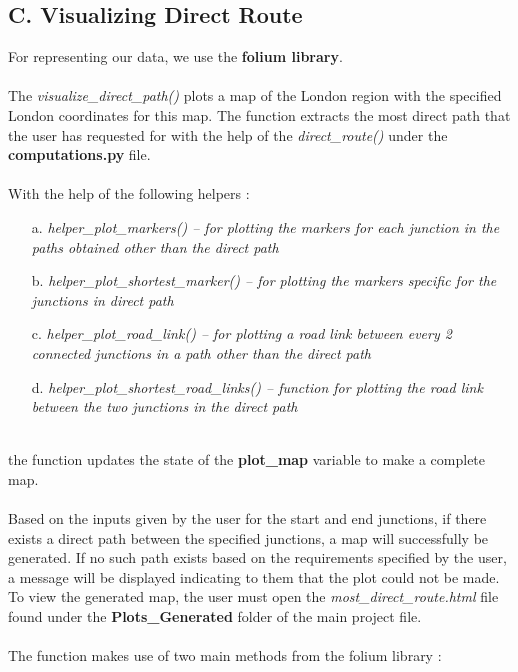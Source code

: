 \documentclass[fontsize=11pt]{IEEEtran}
\begin{document}
\begin{enumerate}
\subsection*{ C. Visualizing Direct Route}
For representing our data, we use the \textbf{folium library}. \\ \\
The \textit{visualize\_direct\_path()} plots a map of the London region with the specified London coordinates for this map. The function extracts the most direct path that the user has requested for with the help of the \textit{direct\_route()} under the \textbf{computations.py} file. \\ \\
With the help of the following helpers :
\begin{enumerate}
    \item[a.] \textit{helper\_plot\_markers() -- for plotting the markers for each junction in the paths obtained other than the direct path} \\
    \item[b.]
    \textit{helper\_plot\_shortest\_marker() -- for plotting the markers specific for the junctions in direct path} \\ \item[c.]\textit{helper\_plot\_road\_link() -- for plotting a road link between every 2 connected junctions in a path other than the direct path} \\
    \item[d.] \textit{helper\_plot\_shortest\_road\_links() -- function for plotting the road link between the two junctions in the direct path} \\
\end{enumerate} \\
the function updates the state of the \textbf{plot\_map} variable to make a complete map. \\ \\
Based on the inputs given by the user for the start and end junctions, if there exists a direct path between the specified junctions, a map will successfully be generated. If no such path exists based on the requirements specified by the user, a message will be displayed indicating to them that the plot could not be made. \\
To view the generated map, the user must open the \textit{most\_direct\_route.html} file found under the \textbf{Plots\_Generated} folder of the main project file.
 \\ \\
 The function makes use of two main methods from the folium library :
\end{enumerate}
\end{document}
